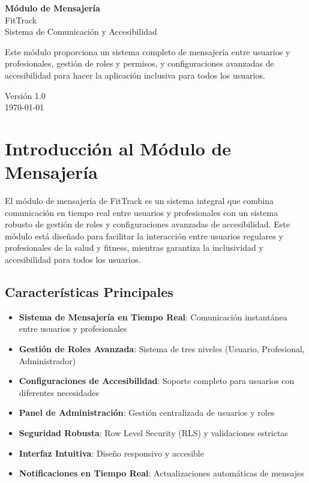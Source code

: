 \documentclass[12pt,a4paper]{article}
\begin{document}
\begin{titlepage}
\centering
\vspace*{2cm}

{\Huge\bfseries Módulo de Mensajería}\\[0.5cm]
{\LARGE FitTrack}\\[1cm]

{\large Sistema de Comunicación y Accesibilidad}\\[2cm]

\begin{minipage}{0.8\textwidth}
\centering
Este módulo proporciona un sistema completo de mensajería entre usuarios y profesionales, gestión de roles y permisos, y configuraciones avanzadas de accesibilidad para hacer la aplicación inclusiva para todos los usuarios.
\end{minipage}

\vfill

{\large Versión 1.0}\\[0.5cm]
{\large \today}

\end{titlepage}

\tableofcontents
\newpage

\section{Introducción al Módulo de Mensajería}

El módulo de mensajería de FitTrack es un sistema integral que combina comunicación en tiempo real entre usuarios y profesionales con un sistema robusto de gestión de roles y configuraciones avanzadas de accesibilidad. Este módulo está diseñado para facilitar la interacción entre usuarios regulares y profesionales de la salud y fitness, mientras garantiza la inclusividad y accesibilidad para todos los usuarios.

\subsection{Características Principales}

\begin{itemize}
    \item \textbf{Sistema de Mensajería en Tiempo Real}: Comunicación instantánea entre usuarios y profesionales
    \item \textbf{Gestión de Roles Avanzada}: Sistema de tres niveles (Usuario, Profesional, Administrador)
    \item \textbf{Configuraciones de Accesibilidad}: Soporte completo para usuarios con diferentes necesidades
    \item \textbf{Panel de Administración}: Gestión centralizada de usuarios y roles
    \item \textbf{Seguridad Robusta}: Row Level Security (RLS) y validaciones estrictas
    \item \textbf{Interfaz Intuitiva}: Diseño responsivo y accesible
    \item \textbf{Notificaciones en Tiempo Real}: Actualizaciones automáticas de mensajes
\end{itemize}
\end{document}

